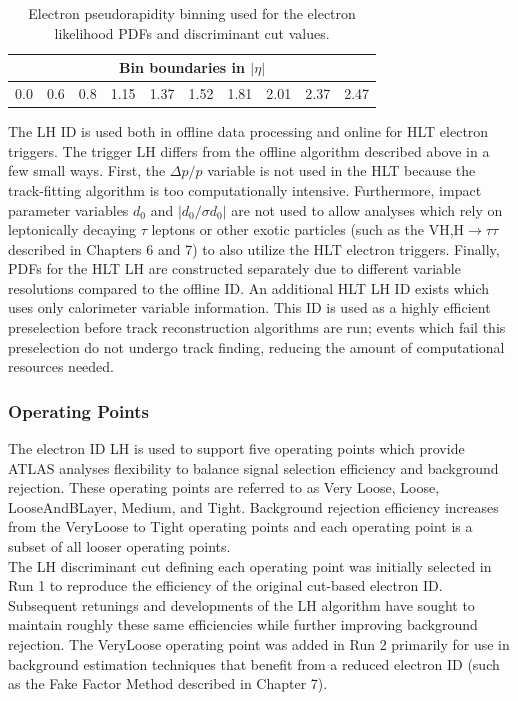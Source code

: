 \begin{table}[!htbp]
\begin{center}
\begin{tabular}{cccccccccc}
\hline
\multicolumn{10}{c}{Bin boundaries in $|\eta|$}\\
\hline
0.0& 0.6& 0.8& 1.15& 1.37& 1.52& 1.81& 2.01& 2.37& 2.47 \\
\hline
\end{tabular}
\end{center}
\caption{Electron pseudorapidity binning used for the electron likelihood PDFs and discriminant cut values.}
\label{tab:etabins}
\end{table}

The LH ID is used both in offline data processing and online for HLT electron triggers. The trigger LH differs from the offline algorithm described above in a few small ways. First, the $\Delta p/p$ variable is not used in the HLT because the track-fitting algorithm is too computationally intensive. Furthermore, impact parameter variables $d_0$ and $|d_0/\sigma d_0|$ are not used to allow analyses which rely on leptonically decaying $\tau$ leptons or other exotic particles (such as the VH,H$\rightarrow\tau\tau$ described in Chapters 6 and 7) to also utilize the HLT electron triggers. Finally, PDFs for the HLT LH are constructed separately due to different variable resolutions compared to the offline ID. An additional HLT LH ID exists which uses only calorimeter variable information. This ID is used as a highly efficient preselection before track reconstruction algorithms are run; events which fail this preselection do not undergo track finding, reducing the amount of computational resources needed. 

\subsubsection{Operating Points}
The electron ID LH is used to support five operating points which provide ATLAS analyses flexibility to balance signal selection efficiency and background rejection. These operating points are referred to as Very Loose, Loose, LooseAndBLayer, Medium, and Tight. Background rejection efficiency increases from the VeryLoose to Tight operating points and each operating point is a subset of all looser operating points.\\

The LH discriminant cut defining each operating point was initially selected in Run 1 to reproduce the efficiency of the original cut-based electron ID. Subsequent retunings and developments of the LH algorithm have sought to maintain roughly these same efficiencies while further improving background rejection. The VeryLoose operating point was added in Run 2 primarily for use in background estimation techniques that benefit from a reduced electron ID (such as the Fake Factor Method described in Chapter 7).\\

